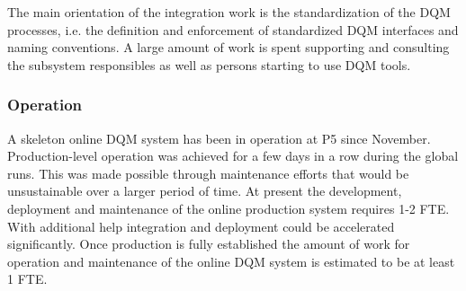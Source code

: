 The main orientation of the integration work is the standardization of the DQM processes, i.e. the definition and enforcement of standardized DQM interfaces 
and naming conventions.
A large amount of work is spent supporting and consulting the
subsystem responsibles as well as persons starting to use
DQM tools.

\subsubsection*{Operation}

A skeleton online DQM system has been in operation at P5 since November.
Production-level operation was achieved for a few days in a row during
the global runs. This was made possible through maintenance efforts that would be unsustainable over a larger period of time.
At present the development, deployment and maintenance of the 
online production system requires 1-2 FTE. With additional help 
integration and deployment could be accelerated significantly.
Once production is fully established the amount of work for 
operation and maintenance of the online DQM system is estimated to be at least 
1 FTE.

